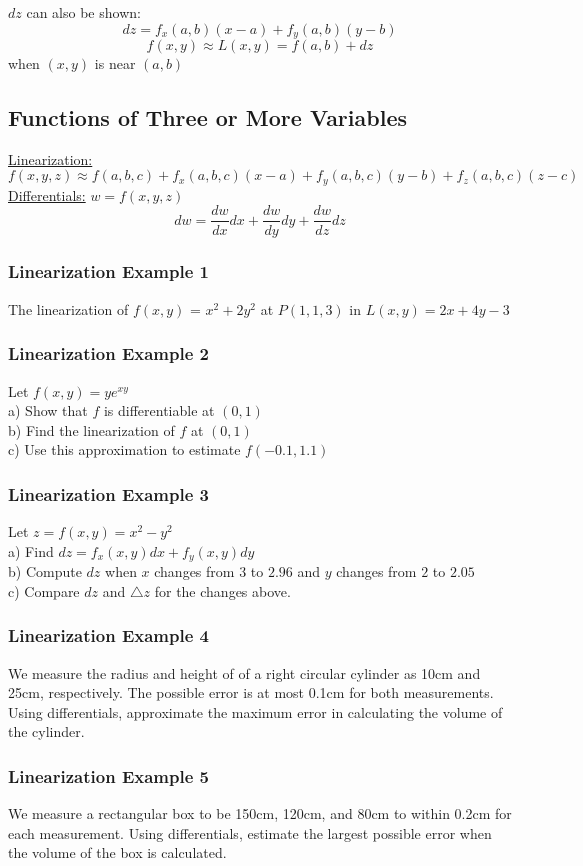 \documentclass[12pt]{article}
\begin{document}
\(dz\) can also be shown:
\[
	dz=f_x(a,b)(x-a) + f_y(a,b)(y-b)
\]
\[
	f(x,y) \approx L(x,y) = f(a,b) + dz
\]
when \((x,y)\) is near \((a,b)\) 

\subsection{Functions of Three or More Variables}
\underline{Linearization:}
\[
	f(x,y,z) \approx f(a,b,c) + f_x(a,b,c)(x-a) + f_y(a,b,c)(y-b) + f_z(a,b,c)(z-c)
\]
\underline{Differentials:} \(w=f(x,y,z)\) 
\[
	dw=\frac{dw}{dx}dx + \frac{dw}{dy}dy + \frac{dw}{dz}dz
\]
\subsubsection{Linearization Example 1}
The linearization of \(f(x,y)\) = \(x^2+2y^2\) at \(P(1,1,3)\) in \(L(x,y) = 2x+4y-3\) 

\subsubsection{Linearization Example 2}
Let \(f(x,y) = ye^{xy}\) \\
a) Show that \(f\) is differentiable at \((0,1)\) \\
b) Find the linearization of \(f\) at \((0,1)\) \\
c) Use this approximation to estimate \(f(-0.1,1.1)\) 

\subsubsection{Linearization Example 3}
Let \(z=f(x,y)=x^2-y^2\) \\
a) Find \(dz=f_x(x,y)dx+f_y(x,y)dy\)\\
b) Compute \(dz\) when \(x\) changes from \(3\) to \(2.96\) and \(y\) changes from \(2\) to \(2.05\) \\
c) Compare \(dz\) and \(\triangle z\) for the changes above.

\subsubsection{Linearization Example 4}
We measure the radius and height of of a right circular cylinder as 10cm and 25cm, respectively.
The possible error is at most 0.1cm for both measurements. Using differentials, approximate the maximum error in calculating the volume of the cylinder.

\subsubsection{Linearization Example 5}
We measure a rectangular box to be 150cm, 120cm, and 80cm to within 0.2cm for each measurement. Using differentials, estimate the largest possible error when the volume of the box is calculated.
\end{document}
